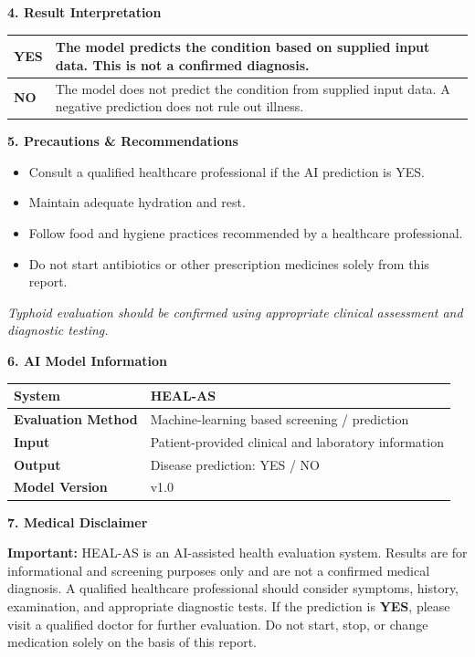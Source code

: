 \documentclass[11pt,a4paper]{article}
\newcommand{\sectiontitle}[1]{\vspace{8pt}\noindent\colorbox{HealBlue}{\parbox{\dimexpr\linewidth-2\fboxsep}{\color{white}\textbf{\large #1}}}\vspace{5pt}}
\begin{document}
\sectiontitle{4. Result Interpretation}
\begin{tabularx}{\linewidth}{|p{2cm}|X|}
\hline
\textbf{\color{HealRed}YES} & The model predicts the condition based on supplied input data. This is not a confirmed diagnosis.\\ \hline
\textbf{\color{HealGreen}NO} & The model does not predict the condition from supplied input data. A negative prediction does not rule out illness.\\ \hline
\end{tabularx}

\sectiontitle{5. Precautions \& Recommendations}
\begin{tcolorbox}[colback=white,colframe=HealRed]
\begin{itemize}[leftmargin=1.2cm]
\item Consult a qualified healthcare professional if the AI prediction is YES.
\item Maintain adequate hydration and rest.
\item Follow food and hygiene practices recommended by a healthcare professional.
\item Do not start antibiotics or other prescription medicines solely from this report.
\end{itemize}
\end{tcolorbox}

\textit{Typhoid evaluation should be confirmed using appropriate clinical assessment and diagnostic testing.}

\sectiontitle{6. AI Model Information}
\begin{tabularx}{\linewidth}{|l|X|}
\hline \textbf{System} & HEAL-AS \\ \hline
\textbf{Evaluation Method} & Machine-learning based screening / prediction \\ \hline
\textbf{Input} & Patient-provided clinical and laboratory information \\ \hline
\textbf{Output} & Disease prediction: YES / NO \\ \hline
\textbf{Model Version} & v1.0 \\ \hline
\end{tabularx}

\sectiontitle{7. Medical Disclaimer}
\begin{tcolorbox}[colback=HealLight,colframe=HealBlue]
\textbf{Important:} HEAL-AS is an AI-assisted health evaluation system. Results are for informational and screening purposes only and are not a confirmed medical diagnosis. A qualified healthcare professional should consider symptoms, history, examination, and appropriate diagnostic tests. If the prediction is \textbf{YES}, please visit a qualified doctor for further evaluation. Do not start, stop, or change medication solely on the basis of this report.
\end{tcolorbox}
\end{document}
